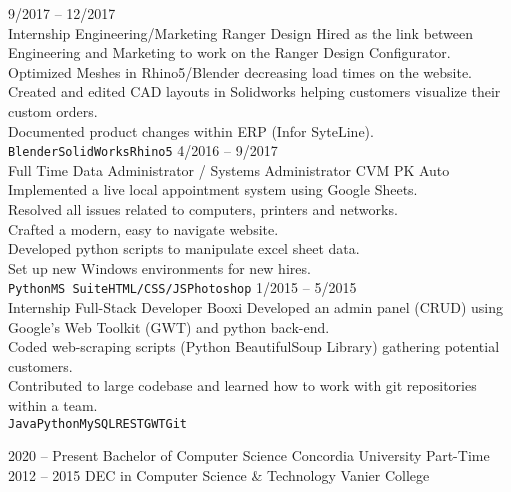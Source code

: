 \documentclass[9pt]{developercv} %
\begin{document}
\begin{entrylist}
	\entry
		{9/2017 -- 12/2017\\\footnotesize{Internship}}
		{Engineering/Marketing}
		{Ranger Design}
    {Hired as the link between Engineering and Marketing to work on the Ranger Design Configurator.\\
      Optimized Meshes in Rhino5/Blender decreasing load times on the website.\\
      Created and edited CAD layouts in Solidworks helping customers visualize their custom orders.\\
      Documented product changes within ERP (Infor SyteLine). 
      \\\texttt{Blender}\slashsep\texttt{SolidWorks}\slashsep\texttt{Rhino5}}
	\entry
		{4/2016 -- 9/2017\\\footnotesize{Full Time}}
		{Data Administrator / Systems Administrator}
		{CVM PK Auto}
    {Implemented a live local appointment system using Google Sheets.\\
      Resolved all issues related to computers, printers and networks.\\
      Crafted a modern, easy to navigate website.\\
      Developed python scripts to manipulate excel sheet data.\\
      Set up new Windows environments for new hires.
      \\\texttt{Python}\slashsep\texttt{MS Suite}\slashsep\texttt{HTML/CSS/JS}\slashsep\texttt{Photoshop}}
	\entry
		{1/2015 -- 5/2015\\\footnotesize{Internship}}
		{Full-Stack Developer}
		{Booxi}
    {Developed an admin panel (CRUD) using Google's Web Toolkit (GWT) and python back-end.\\
      Coded web-scraping scripts (Python BeautifulSoup Library) gathering potential customers.\\
      Contributed to large codebase and learned how to work with git repositories within a team.
      \\\texttt{Java}\slashsep\texttt{Python}\slashsep\texttt{MySQL}\slashsep\texttt{REST}\slashsep\texttt{GWT}\slashsep\texttt{Git}}
\end{entrylist}



\begin{entrylist}
	\entry
		{2020 -- Present}
		{Bachelor of Computer Science}
		{Concordia University}
		{Part-Time}
	\entry
		{2012 -- 2015}
		{DEC in Computer Science \& Technology}
		{Vanier College}
		{}
\end{entrylist}
\end{document}
